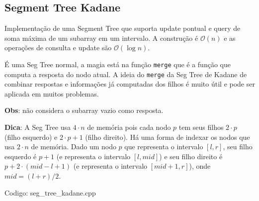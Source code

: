 \documentclass[10pt, a4paper, oneside]{book}
\begin{document}
\subsection{Segment Tree Kadane}


Implementação de uma Segment Tree que suporta update pontual e query de soma máxima de um subarray em um intervalo. A construção é $\mathcal{O}(n)$ e as operações de consulta e update são $\mathcal{O}(\log n)$.



É uma Seg Tree normal, a magia está na função \texttt{merge} que é a função que computa a resposta do nodo atual. A ideia do \texttt{merge} da Seg Tree de Kadane de combinar respostas e informações já computadas dos filhos é muito útil e pode ser aplicada em muitos problemas.



\textbf{Obs}: não considera o subarray vazio como resposta.



\textbf{Dica}: A Seg Tree usa $4 \cdot n$ de memória pois cada nodo $p$ tem seus filhos $2 \cdot p$ (filho esquerdo) e $2 \cdot p + 1$ (filho direito). Há uma forma de indexar os nodos que usa $2 \cdot n$ de memória. Dado um nodo $p$ que representa o intervalo $[l, r]$, seu filho esquerdo é $p+1$ (e representa o intervalo $[l, mid]$) e seu filho direito é $p+2 \cdot (mid-l+1)$ (e representa o intervalo $[mid+1, r]$), onde $mid = (l+r)/2$.
\hfill

Codigo: seg\_tree\_kadane.cpp
\end{document}
